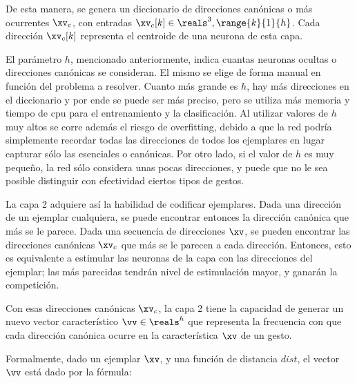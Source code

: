 De esta manera, se genera un diccionario de direcciones canónicas o más ocurrentes $\xv_c$, con entradas $\xv_c[k] \in \reals^3, \range{k}{1}{h}$. Cada dirección $\xv_c[k]$ representa el centroide de una neurona de esta capa. 


El parámetro $h$, mencionado anteriormente, indica cuantas neuronas ocultas o direcciones canónicas se consideran. El mismo se elige de forma manual en función del problema a resolver. Cuanto más grande es $h$, hay más direcciones en el diccionario y por ende se puede ser más preciso, pero se utiliza más memoria y tiempo de cpu para el entrenamiento y la clasificación. Al utilizar valores de $h$ muy altos se corre además el riesgo de overfitting, debido a que la red podría simplemente recordar todas las direcciones de todos los ejemplares en lugar capturar sólo las esenciales o canónicas. Por otro lado, si el valor de $h$ es muy pequeño, la red sólo considera unas pocas direcciones, y puede que no le sea posible distinguir con efectividad ciertos tipos de gestos.

La capa 2 adquiere así la habilidad de codificar ejemplares. Dada una dirección de un ejemplar cualquiera, se puede encontrar entonces la dirección canónica que más se le parece. Dada una secuencia de direcciones $\xv$, se pueden encontrar las direcciones canónicas $\xv_c$ que más se le parecen a cada dirección. Entonces, esto es equivalente a estimular las neuronas de la capa con las direcciones del ejemplar; las más parecidas tendrán nivel de estimulación mayor, y ganarán la competición. 

Con esas direcciones canónicas $\xv_c$, la capa 2 tiene la capacidad de generar un nuevo vector característico $\vv \in \reals^h$ que representa la frecuencia con que cada dirección canónica ocurre en la característica $\xv$ de un gesto. 


Formalmente, dado un ejemplar $\xv$, y una función de distancia $dist$, el vector $\vv$ está dado por la fórmula:


